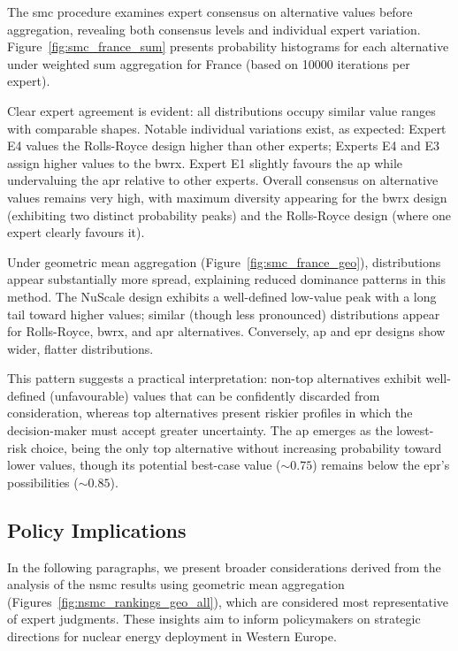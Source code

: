 The \gls{smc} procedure examines expert consensus on alternative values before aggregation, revealing both consensus levels and individual expert variation. Figure~\ref{fig:smc_france_sum} presents probability histograms for each alternative under weighted sum aggregation for France (based on 10000 iterations per expert).

Clear expert agreement is evident: all distributions occupy similar value ranges with comparable shapes. Notable individual variations exist, as expected: Expert E4 values the Rolls-Royce design higher than other experts; Experts E4 and E3 assign higher values to the \gls{bwrx}. Expert E1 slightly favours the \gls{ap} while undervaluing the \gls{apr} relative to other experts. Overall consensus on alternative values remains very high, with maximum diversity appearing for the \gls{bwrx} design (exhibiting two distinct probability peaks) and the Rolls-Royce design (where one expert clearly favours it).

Under geometric mean aggregation (Figure~\ref{fig:smc_france_geo}), distributions appear substantially more spread, explaining reduced dominance patterns in this method. The NuScale design exhibits a well-defined low-value peak with a long tail toward higher values; similar (though less pronounced) distributions appear for Rolls-Royce, \gls{bwrx}, and \gls{apr} alternatives. Conversely, \gls{ap} and \gls{epr} designs show wider, flatter distributions. 

This pattern suggests a practical interpretation: non-top alternatives exhibit well-defined (unfavourable) values that can be confidently discarded from consideration, whereas top alternatives present riskier profiles in which the decision-maker must accept greater uncertainty. The \gls{ap} emerges as the lowest-risk choice, being the only top alternative without increasing probability toward lower values, though its potential best-case value ($\sim 0.75$) remains below the \gls{epr}'s possibilities ($\sim 0.85$).

\subsection{Policy Implications}
\label{sec:policy_brief}
In the following paragraphs, we present broader considerations derived from the analysis of the \gls{nsmc} results using geometric mean aggregation (Figures~\ref{fig:nsmc_rankings_geo_all}), which are considered most representative of expert judgments. These insights aim to inform policymakers on strategic directions for nuclear energy deployment in Western Europe.

